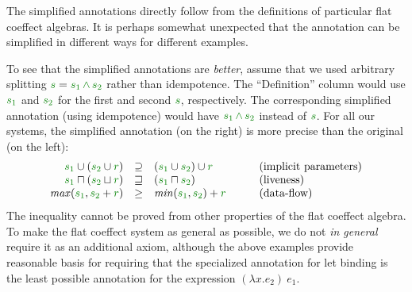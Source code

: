 \noindent
The simplified annotations directly follow from the definitions of particular flat coeffect 
algebras. It is perhaps somewhat unexpected that the annotation can be simplified in different
ways for different examples. 

To see that the simplified annotations are \emph{better}, assume that we used arbitrary 
splitting $\cclrd{s} = \cclrd{s_1}\,\czip\,\cclrd{s_2}$ rather than idempotence. The
``Definition'' column would use $\cclrd{s_1}$ and $\cclrd{s_2}$ for the first and second 
$\cclrd{s}$, respectively. The corresponding simplified annotation (using idempotence) would
have $\cclrd{s_1}\,\czip\,\cclrd{s_2}$ instead of $\cclrd{s}$. For all our systems, the 
simplified annotation (on the right) is more precise than the original (on the left):
%
\begin{equation*}
\begin{array}{rclll}
\cclrd{s_1} \cup (\cclrd{s_2} \cup \cclrd{r}) &\supseteq& (\cclrd{s_1} \cup \cclrd{s_2}) \cup \cclrd{r} 
  && \textnormal{(implicit parameters)}\\
\cclrd{s_1} \sqcap (\cclrd{s_2} \sqcup \cclrd{r}) &\sqsupseteq&  (\cclrd{s_1} \sqcap \cclrd{s_2}) 
  && \textnormal{(liveness)} \\
\mathit{max}(\cclrd{s_1}, \cclrd{s_2} + \cclrd{r}) &\geq& \mathit{min}(\cclrd{s_1}, \cclrd{s_2}) + \cclrd{r} 
  &\quad& \textnormal{(data-flow)} \\
\end{array}
\end{equation*}
%
The inequality cannot be proved from other properties of the flat coeffect algebra. To make
the flat coeffect system as general as possible, we do not \emph{in general} require it as
an additional axiom, although the above examples provide reasonable basis for requiring 
that the specialized annotation for let binding is the least possible annotation for the 
expression $(\lambda x.e_2)~e_1$.




%                                              

